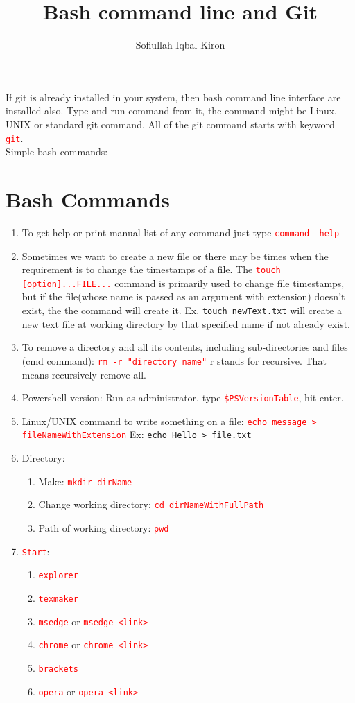 \documentclass[10 pt]{article}
\title{Bash command line and Git}
\author{Sofiullah Iqbal Kiron}
\newcommand{\R}{\textcolor{red}} %
\newcommand{\T}{\texttt}
\begin{document}
\maketitle
\justify

If git is already installed in your system, then bash command line interface are installed also. Type and run command from it, the command might be Linux, UNIX or standard git command. All of the git command starts with keyword \R{\T{git}}.\\
Simple bash commands:

\section*{Bash Commands}
\begin{enumerate}
	\item To get help or print manual list of any command just type \R{\T{command --help}}
	\item Sometimes we want to create a new file or there may be times when the requirement is to change the timestamps of a file. The \R{\T{touch [option]...FILE...}} command is primarily used to change file timestamps, but if the file(whose name is passed as an argument with extension) doesn't exist, the the command will create it. Ex. \textcolor{red!70}{\texttt{touch newText.txt}} will create a new text file at working directory by that specified name if not already exist.
	\item To remove a directory and all its contents, including sub-directories and files (cmd command): \R{\T{rm -r "directory name"}} r stands for recursive. That means recursively remove all.
	\item Powershell version: Run as administrator, type \R{\T{\$PSVersionTable}}, hit enter.
	\item Linux/UNIX command to write something on a file: \R{\T{echo message > fileNameWithExtension}} Ex: \textcolor{red!70}{\texttt{echo Hello > file.txt}}
	
	\item Directory:
		\begin{enumerate}
			\item Make: \R{\T{mkdir dirName}}
			\item Change working directory: \R{\T{cd dirNameWithFullPath}}
			\item Path of working directory: \R{\T{pwd}}
		\end{enumerate}
	
	\item \R{\T{Start}}:
		\begin{enumerate}
			\item \R{\T{explorer}}
			\item \R{\T{texmaker}}
			\item \R{\T{msedge}} or \R{\T{msedge <link>}}
			\item \R{\T{chrome}} or \R{\T{chrome <link>}}
			\item \R{\T{brackets}}
			\item \R{\T{opera}} or \R{\T{opera <link>}}
			

\end{enumerate}
\end{enumerate}
\end{document}
